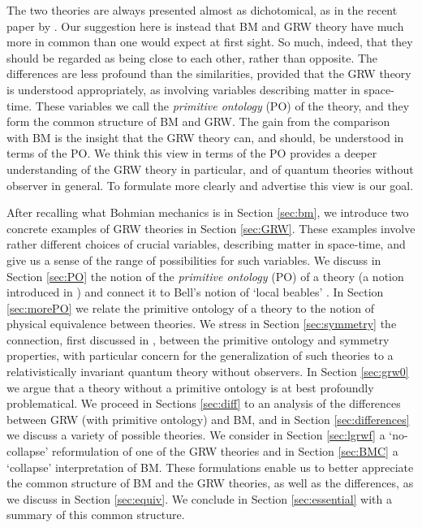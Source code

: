 \documentclass[12pt]{article}
\newcommand{\po}{primitive ontology }
\begin{document}
The two theories are always presented almost as dichotomical, as in the recent paper by \citet{putnam}.
Our suggestion here is instead that {\sf BM} and {\sf GRW} theory have much more in common than one would expect at first sight. 
So much, indeed, that they should be regarded as being close to each other, rather than opposite. 
The differences are less profound than the similarities, provided that the {\sf GRW} theory is understood appropriately, as involving variables describing matter in space-time.
These variables we call the \textit{primitive ontology} (PO) of the theory, and they form the common structure of {\sf BM} and {\sf GRW}. The gain from the comparison with {\sf BM} is the insight that the {\sf GRW} theory can, and should, be understood in terms of the PO. We think this view in terms of the PO provides a deeper understanding of the {\sf GRW} theory in particular, and of quantum theories without observer in general. To formulate more clearly and advertise this view is our goal.

After recalling what Bohmian mechanics is in Section \ref{sec:bm}, we introduce
two concrete examples of {\sf GRW} theories in Section \ref{sec:GRW}. These examples involve rather different choices of crucial variables, describing matter in space-time, and give us a sense of the range of possibilities for such variables. 
We discuss in Section \ref{sec:PO}   
the notion of the {\it{primitive ontology} }(PO) of a theory 
(a notion introduced in \citep{DGZ92})
and connect it to  
Bell's notion  of `local beables'   \citep{Bell76}.
In Section  \ref{sec:morePO} we relate the primitive ontology of a theory to the notion of physical equivalence between theories.   We stress in Section \ref{sec:symmetry} the connection, first discussed in \citep{Gol98}, between the \po and symmetry properties, with particular concern for the generalization of such theories to a relativistically invariant quantum theory without observers. In  Section \ref{sec:grw0} 
we argue that a theory without a primitive ontology is at best profoundly problematical.
We proceed in Sections \ref{sec:diff} to an analysis of the differences between {\sf GRW} (with primitive ontology) and {\sf BM}, and in Section \ref{sec:differences} we discuss a variety of possible theories. We consider in Section \ref{sec:lgrwf} a `no-collapse' reformulation of one of the {\sf GRW} theories and in Section \ref{sec:BMC} a `collapse' interpretation of {\sf BM}. These formulations  enable us to better appreciate the common structure of {\sf BM} and the {\sf GRW} theories, as well as the differences, as we discuss in Section \ref{sec:equiv}. We conclude in Section \ref{sec:essential} with a summary of this common structure.
\end{document}

